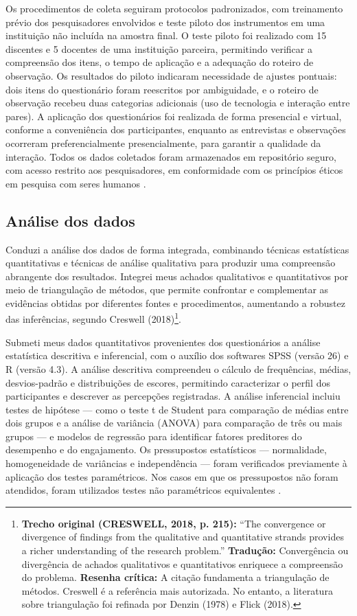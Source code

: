 Os procedimentos de coleta seguiram protocolos padronizados, com treinamento prévio dos pesquisadores envolvidos e teste piloto dos instrumentos em uma instituição não incluída na amostra final. O teste piloto foi realizado com 15 discentes e 5 docentes de uma instituição parceira, permitindo verificar a compreensão dos itens, o tempo de aplicação e a adequação do roteiro de observação. Os resultados do piloto indicaram necessidade de ajustes pontuais: dois itens do questionário foram reescritos por ambiguidade, e o roteiro de observação recebeu duas categorias adicionais (uso de tecnologia e interação entre pares). A aplicação dos questionários foi realizada de forma presencial e virtual, conforme a conveniência dos participantes, enquanto as entrevistas e observações ocorreram preferencialmente presencialmente, para garantir a qualidade da interação. Todos os dados coletados foram armazenados em repositório seguro, com acesso restrito aos pesquisadores, em conformidade com os princípios éticos em pesquisa com seres humanos \cite{SANTOS2024}.

\subsection{Análise dos dados}
\label{subsec:analise_dados}

Conduzi a análise dos dados de forma integrada, combinando técnicas estatísticas quantitativas e técnicas de análise qualitativa para produzir uma compreensão abrangente dos resultados. Integrei meus achados qualitativos e quantitativos por meio de triangulação de métodos, que permite confrontar e complementar as evidências obtidas por diferentes fontes e procedimentos, aumentando a robustez das inferências, segundo Creswell (2018)\footnote{\textbf{Trecho original (CRESWELL, 2018, p. 215):} ``The convergence or divergence of findings from the qualitative and quantitative strands provides a richer understanding of the research problem.'' \textbf{Tradução:} Convergência ou divergência de achados qualitativos e quantitativos enriquece a compreensão do problema. \textbf{Resenha crítica:} A citação fundamenta a triangulação de métodos. Creswell é a referência mais autorizada. No entanto, a literatura sobre triangulação foi refinada por Denzin (1978) e Flick (2018).}.

Submeti meus dados quantitativos provenientes dos questionários a análise estatística descritiva e inferencial, com o auxílio dos softwares SPSS (versão 26) e R (versão 4.3). A análise descritiva compreendeu o cálculo de frequências, médias, desvios-padrão e distribuições de escores, permitindo caracterizar o perfil dos participantes e descrever as percepções registradas. A análise inferencial incluiu testes de hipótese — como o teste t de Student para comparação de médias entre dois grupos e a análise de variância (ANOVA) para comparação de três ou mais grupos — e modelos de regressão para identificar fatores preditores do desempenho e do engajamento. Os pressupostos estatísticos — normalidade, homogeneidade de variâncias e independência — foram verificados previamente à aplicação dos testes paramétricos. Nos casos em que os pressupostos não foram atendidos, foram utilizados testes não paramétricos equivalentes \cite{BARDIN2016}.

